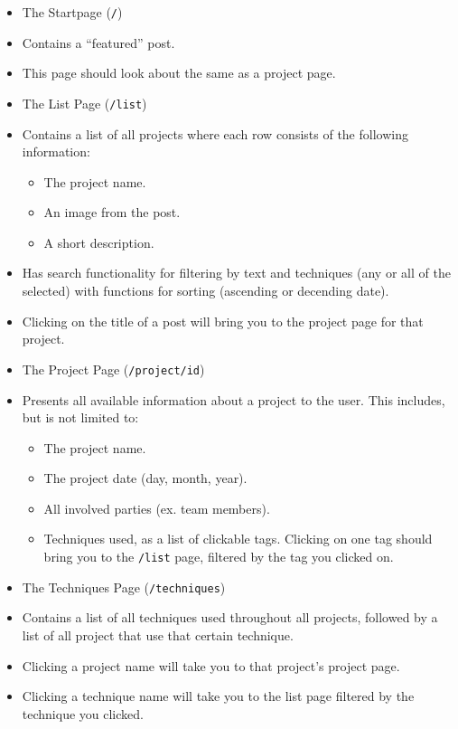 \documentclass{TDP003mall}
\begin{document}
\begin{itemize}
    \item The Startpage (\texttt{/})
    \item Contains a ``featured'' post.
    \item This page should look about the same as a project page.
    \item The List Page (\texttt{/list})
    \item Contains a list of all projects where each row consists of the following information:
      \begin{itemize}
          \item The project name.
          \item An image from the post.
          \item A short description.
      \end{itemize}
    \item Has search functionality for filtering by text and techniques (any or all of the selected) with functions for sorting (ascending or decending date).
    \item Clicking on the title of a post will bring you to the project page for that project.
    \item The Project Page (\texttt{/project/id})
    \item Presents all available information about a project to the user. This includes, but is not limited to:
      \begin{itemize}
          \item The project name.
          \item The project date (day, month, year).
          \item All involved parties (ex. team members).
          \item Techniques used, as a list of clickable tags. Clicking on one tag should bring you to the \texttt{/list} page, filtered by the tag you clicked on.
      \end{itemize}
    \item The Techniques Page (\texttt{/techniques})
    \item Contains a list of all techniques used throughout all projects, followed by a list of all project that use that certain technique.
    \item Clicking a project name will take you to that project's project page.
    \item Clicking a technique name will take you to the list page filtered by the technique you clicked.
\end{itemize}
\end{document}
